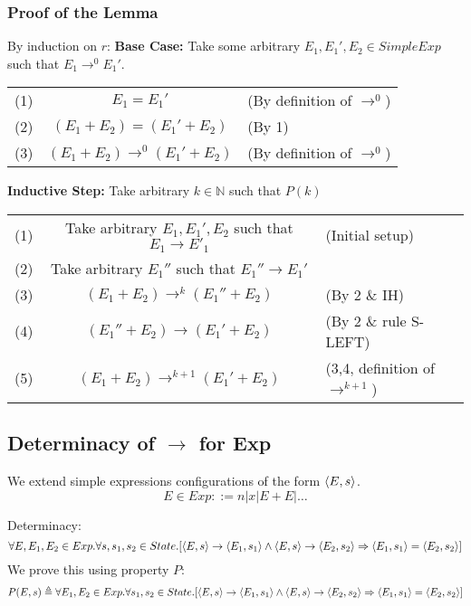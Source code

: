 \documentclass{report}
\begin{document}
            \subsubsection*{Proof of the Lemma}
                By induction on $r$:
                \textbf{Base Case:}
                Take some arbitrary $E_1, E_1', E_2 \in SimpleExp$ such that $E_1 \to^0 E_1'$.
                \begin{center}
                    \begin{tabular}{r c l}
                        (1) & $E_1 = E_1'$ & (By definition of $\to^0$) \\
                        (2) & $(E_1 + E_2) = (E_1' + E_2)$ & (By 1) \\
                        (3) & $(E_1 + E_2) \to^0 (E_1' + E_2)$ & (By definition of $\to^0$) \\
                    \end{tabular}
                \end{center}
                \textbf{Inductive Step:}
                Take arbitrary $k \in \mathbb{N}$ such that $P(k)$
                \begin{center}
                    \begin{tabular}{r c l}
                        (1) & Take arbitrary $E_1, E_1', E_2$ such that $E_1 \to E'_1$ & (Initial setup) \\
                        (2) & Take arbitrary $E_1''$ such that $E_1'' \to E_1'$ & \\
                        (3) & $(E_1 + E_2) \to^k (E_1'' + E_2)$ & (By 2 \& IH) \\
                        (4) & $(E_1'' + E_2) \to (E_1' + E_2)$ & (By 2 \& rule S-LEFT) \\
                        (5) & $(E_1 + E_2) \to^{k+1} (E_1' + E_2)$ & (3,4, definition of $\to^{k+1}$) \\
                    \end{tabular}
                \end{center}
        \subsection*{Determinacy of $\to$ for Exp}
            We extend simple expressions configurations of the form $\langle E, s \rangle$.
            \[E \in Exp ::= n | x | E + E | \dots\]
            
            Determinacy: 
            \[\forall E,E_1,E_2 \in Exp . \forall s, s_1, s_2 \in State . [\langle E, s \rangle \to \langle E_1, s_1 \rangle \land \langle E, s \rangle \to \langle E_2, s_2 \rangle \Rightarrow \langle E_1, s_1 \rangle = \langle E_2, s_2 \rangle]\]
            We prove this using property $P$:
            \[P(E,s) \triangleq \forall E_1,E_2 \in Exp . \forall s_1, s_2 \in State . [\langle E, s \rangle \to \langle E_1, s_1 \rangle \land \langle E, s \rangle \to \langle E_2, s_2 \rangle \Rightarrow \langle E_1, s_1 \rangle = \langle E_2, s_2 \rangle]\]
\end{document}

